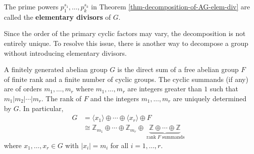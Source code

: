 \begin{definition}
	The prime powers $p_1^{s_1},\dots, p_k^{s_k}$ in Theorem \ref{thm-decomposition-of-AG-elem-div} are called the \textbf{elementary divisors} of $G$.
\end{definition}
Since the order of the primary cyclic factors may vary, the decomposition is not entirely unique. To resolve this issue, there is another way to decompose a group without introducing elementary divisors.
\begin{theorem} \label{thm-decomposition-of-modules-inv-fac}
	A finitely generated abelian group $G$ is the direct sum of a free abelian group $F$ of finite rank and a finite number of
	cyclic  groups. The cyclic  summands (if any) are of orders $m_1,\dots, m_r$ where $m_1,\dots, m_r$ are integers greater than $1$ such that $m_1|m_2|\cdots |m_r$. The rank of $F$ and the integers $m_1,\dots, m_r$ are uniquely determined by $G$. In particular,
	\begin{align*}
		G&= \langle x_1 \rangle\oplus \cdots \oplus \langle x_r \rangle\oplus F\\
		&\cong \mathbb{Z}_{m_1}\oplus \cdots \oplus \mathbb{Z}_{m_r}\oplus \underbrace{\mathbb{Z} \oplus \cdots \oplus \mathbb{Z}}_{\operatorname{rank} F \text{ summands}}
	\end{align*}
	where $x_1,\dots, x_r\in G$ with $|x_i| = m_i$ for all $i=1,\dots, r$.
\end{theorem}
